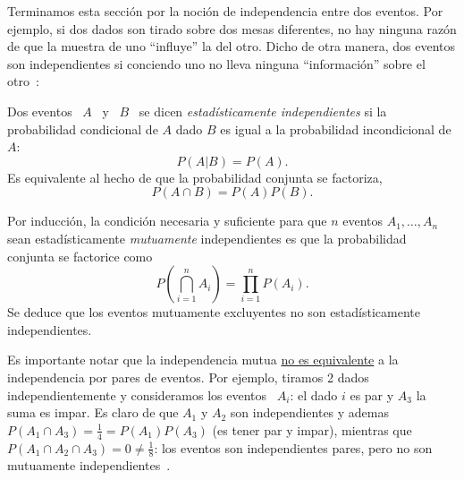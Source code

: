 Terminamos  esta   secci\'on  por  la   noci\'on  de  independencia   entre  dos
eventos. Por ejemplo, si dos dados son tirado sobre dos mesas diferentes, no hay
ninguna raz\'on de que la muestra de  uno ``influye'' la del otro. Dicho de otra
manera,  dos  eventos son  independientes  si  conciendo  uno no  lleva  ninguna
``informaci\'on'' sobre el otro~\cite{Bre88, ManWol95, Hau01, JacPro03, Bor09}:
%
\begin{definicion}
  Dos eventos \ $A$ \ y \ $B$ \ se dicen {\it estad\'isticamente independientes}
  si la  probabilidad condicional  de $A$  dado $B$ es  igual a  la probabilidad
  incondicional de $A$:
  \[
   P(A|B) = P(A).
   \]
   Es equivalente al hecho de que la probabilidad conjunta se factoriza,
  \[
   P(A \cap B) = P(A) P(B).
   \]
\end{definicion}
%
Por  inducci\'on, la  condici\'on necesaria  y suficiente  para que  $n$ eventos
$A_1,\ldots,A_n$ sean estad\'isticamente {\em mutuamente} independientes es que
la probabilidad conjunta se factorice como
%
\[
P\left( \bigcap_{i=1}^n A_i \right) = \prod_{i=1}^n P(A_i).
\]
%
Se  deduce que  los  eventos mutuamente  excluyentes  no son  estad\'isticamente
independientes.

Es importante notar  que la independencia mutua \underline{no  es equivalente} a
la  independencia  por   pares  de  eventos.   Por  ejemplo,   tiramos  2  dados
independientemente y  consideramos los  eventos \  $A_i$: el dado  $i$ es  par y
$A_3$ la  suma es  impar. Es  claro de que  $A_1$ y  $A_2$ son  independientes y
ademas  $P(A_1 \cap A_3)  = \frac14  = P(A_1)  P(A_3)$ (es  tener par  y impar),
mientras  que $P(A_1  \cap  A_2 \cap  A_3) =  0  \ne \frac18$:  los eventos  son
independientes pares, pero no son mutuamente independientes~\cite{HogMck13}.

